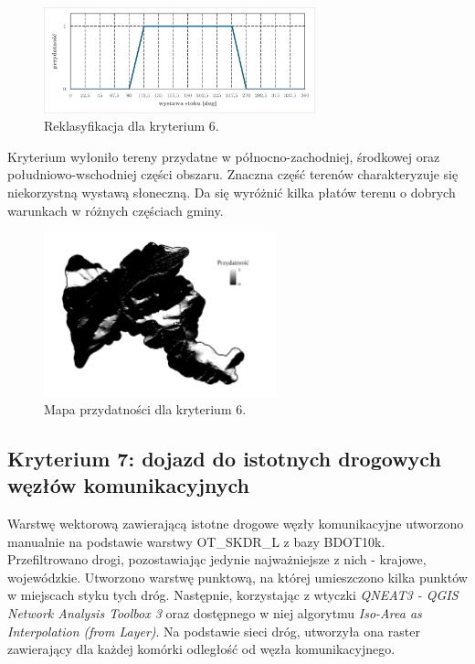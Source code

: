 \documentclass{article}
\begin{document}
\begin{figure}[H]
    \centering
    \includegraphics[width=0.7\textwidth]{img/kryterium6-wykres-glowny.png}
    \caption{Reklasyfikacja dla kryterium 6.}
\end{figure}
\vspace{10pt}

Kryterium wyłoniło tereny przydatne w północno-zachodniej, środkowej oraz południowo-wschodniej części obszaru. Znaczna część terenów charakteryzuje się niekorzystną wystawą słoneczną. Da się wyróżnić kilka płatów terenu o dobrych warunkach w różnych częściach gminy.
\vspace{5pt}

\begin{figure}[H]
    \centering
    \includegraphics[width=0.6\textwidth]{img/kryterium6-layout.jpg}
    \caption{Mapa przydatności dla kryterium 6.}
\end{figure}
\vspace{10pt}

\newpage
\subsection{Kryterium 7: dojazd do istotnych drogowych węzłów komunikacyjnych}
Warstwę wektorową zawierającą istotne drogowe węzły komunikacyjne utworzono manualnie na podstawie warstwy OT\_SKDR\_L z bazy BDOT10k. Przefiltrowano drogi, pozostawiając jedynie najważniejsze z nich - krajowe, wojewódzkie. Utworzono warstwę punktową, na której umieszczono kilka punktów w miejscach styku tych dróg. Następnie, korzystając z wtyczki \textit{QNEAT3 - QGIS Network Analysis Toolbox 3} oraz dostępnego w niej algorytmu \textit{Iso-Area as Interpolation (from Layer)}. Na podstawie sieci dróg, utworzyła ona raster zawierający dla każdej komórki odległość od węzła komunikacyjnego.
\vspace{5pt}
\end{document}
